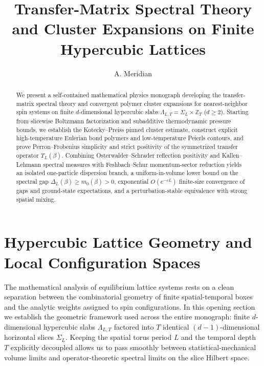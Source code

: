 \documentclass[11pt]{article}
\title{Transfer-Matrix Spectral Theory and Cluster Expansions on Finite Hypercubic Lattices}
\author{A. Meridian}
\date{}
\theoremstyle{definition}
\begin{document}
\maketitle

\begin{abstract}
We present a self-contained mathematical physics monograph developing the
transfer-matrix spectral theory and convergent polymer cluster expansions for
nearest-neighbor spin systems on finite $d$-dimensional hypercubic slabs
$\Lambda_{L,T} = \Sigma_L \times \mathbb{Z}_T$ ($d \ge 2$). Starting from slicewise
Boltzmann factorization and subadditive thermodynamic pressure bounds, we establish
the Kotecky--Preiss pinned cluster estimate, construct explicit high-temperature
Eulerian bond polymers and low-temperature Peierls contours, and prove
Perron--Frobenius simplicity and strict positivity of the symmetrized transfer
operator $T_L(\beta)$. Combining Osterwalder--Schrader reflection positivity and
Kallen--Lehmann spectral measures with Feshbach--Schur momentum-sector reduction
yields an isolated one-particle dispersion branch, a uniform-in-volume lower bound
on the spectral gap $\Delta_L(\beta) \ge m_0(\beta) > 0$, exponential $O(e^{-c L})$
finite-size convergence of gaps and ground-state expectations, and a
perturbation-stable equivalence with strong spatial mixing.
\end{abstract}

\section{Hypercubic Lattice Geometry and Local Configuration Spaces}
\label{sec:s01}

The mathematical analysis of equilibrium lattice systems rests on a clean separation
between the combinatorial geometry of finite spatial-temporal boxes and the analytic
weights assigned to spin configurations. In this opening section we establish the
geometric framework used across the entire monograph: finite $d$-dimensional
hypercubic slabs $\Lambda_{L,T}$ factored into $T$ identical $(d-1)$-dimensional
horizontal slices $\Sigma_L$. Keeping the spatial torus period $L$ and the temporal
depth $T$ explicitly decoupled allows us to pass smoothly between
statistical-mechanical volume limits and operator-theoretic spectral limits on the
slice Hilbert space.
\end{document}
